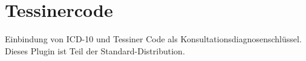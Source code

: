 \section{Tessinercode}
Einbindung von ICD-10 und Tessiner Code als Konsultationsdiagnosenschlüssel. Dieses Plugin ist Teil der Standard-Distribution. 
